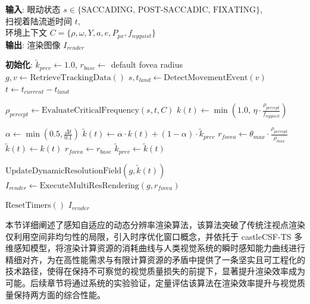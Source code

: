 \begin{algorithm}[htbp]
\caption{感知自适应的动态分辨率渲染算法}
\label{alg:adaptive_resolution_render}
\textbf{输入}: 眼动状态 $s \in \{\text{SACCADING, POST-SACCADIC, FIXATING}\}$, \\
\hspace*{2.4em} 扫视着陆流逝时间 $t$, \\
\hspace*{2.4em} 环境上下文 $C = \{\rho, \omega, Y, a, e, P_{px}, f_{nyquist}\}$ \\
\textbf{输出}: 渲染图像 $I_{render}$
\begin{algorithmic}[1]
\State \textbf{初始化}: $\tilde{k}_{prev} \gets 1.0$, $r_{base} \gets$ default fovea radius
    \State $g, v \gets \text{RetrieveTrackingData}()$ 
    \State $s, t_{land} \gets \text{DetectMovementEvent}(v)$ 
    \State $t \gets t_{current} - t_{land}$
    
    \State $\rho_{percept} \gets \text{EvaluateCriticalFrequency}(s, t, C)$ 
    \State $k(t) \gets \min \left( 1.0, \, \eta \cdot \frac{\rho_{percept}}{f_{nyquist}} \right)$ 
    
        \State $\alpha \gets \min\left(0.5, \frac{\Delta t}{0.1}\right)$ 
        \State $\tilde{k}(t) \gets \alpha \cdot k(t) + (1-\alpha) \cdot \tilde{k}_{prev}$ 
        \State $r_{fovea} \gets \theta_{max} \cdot \frac{\rho_{percept}}{\rho_{max}}$ 
    \Else
        \State $\tilde{k}(t) \gets k(t)$
        \State $r_{fovea} \gets r_{base}$
    \EndIf
    \State $\tilde{k}_{prev} \gets \tilde{k}(t)$ 
    
    \State $\text{UpdateDynamicResolutionField}(g, \tilde{k}(t))$ 
    \State $I_{render} \gets \text{ExecuteMultiResRendering}(g, r_{fovea})$ 
    
        \State $\text{ResetTimers}()$ 
    \EndIf
\EndWhile
\State \Return $I_{render}$
\end{algorithmic}
\end{algorithm}


本节详细阐述了感知自适应的动态分辨率渲染算法，该算法突破了传统注视点渲染仅利用空间非均匀性的局限，引入时序优化窗口概念，并依托于 castleCSF-TS 多维感知模型，将渲染计算资源的消耗曲线与人类视觉系统的瞬时感知能力曲线进行精细对齐，为在高性能需求与有限计算资源的矛盾中提供了一条坚实且可工程化的技术路径，使得在保持不可察觉的视觉质量损失的前提下，显著提升渲染效率成为可能。后续章节将通过系统的实验验证，定量评估该算法在渲染效率提升与视觉质量保持两方面的综合性能。

